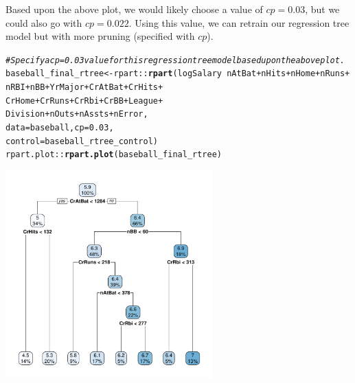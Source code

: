 \documentclass{article}\usepackage[]{graphicx}\usepackage[]{color}
\makeatletter
\newcommand{\hlnum}[1]{\textcolor[rgb]{0.686,0.059,0.569}{#1}}%
\newcommand{\hlcom}[1]{\textcolor[rgb]{0.678,0.584,0.686}{\textit{#1}}}%
\newcommand{\hlopt}[1]{\textcolor[rgb]{0,0,0}{#1}}%
\newcommand{\hlstd}[1]{\textcolor[rgb]{0.345,0.345,0.345}{#1}}%
\newcommand{\hlkwb}[1]{\textcolor[rgb]{0.69,0.353,0.396}{#1}}%
\newcommand{\hlkwc}[1]{\textcolor[rgb]{0.333,0.667,0.333}{#1}}%
\newcommand{\hlkwd}[1]{\textcolor[rgb]{0.737,0.353,0.396}{\textbf{#1}}}%
\newenvironment{kframe}{%
 \def\at@end@of@kframe{}%
 \ifinner\ifhmode%
  \def\at@end@of@kframe{\end{minipage}}%
  \begin{minipage}{\columnwidth}%
 \fi\fi%
 \def\FrameCommand##1{\hskip\@totalleftmargin \hskip-\fboxsep
 \colorbox{shadecolor}{##1}\hskip-\fboxsep
     \hskip-\linewidth \hskip-\@totalleftmargin \hskip\columnwidth}%
 \MakeFramed {\advance\hsize-\width
   \@totalleftmargin\z@ \linewidth\hsize
   \@setminipage}}%
 {\par\unskip\endMakeFramed%
 \at@end@of@kframe}
\newenvironment{knitrout}{}{} %
\makeatother
\begin{document}
Based upon the above plot, we would likely choose a value of $cp = 0.03$, but we could also go with $cp = 0.022$. Using this value, we can retrain our regression tree model but with more pruning (specified with $cp$).

\begin{knitrout}
\color{fgcolor}\begin{kframe}
\begin{alltt}
\hlcom{# Specify a cp=0.03 value for this regression tree model based upon the above plot.}
\hlstd{baseball_final_rtree} \hlkwb{<-}\hlstd{rpart}\hlopt{::}\hlkwd{rpart}\hlstd{(logSalary} \hlopt{~} \hlstd{nAtBat} \hlopt{+} \hlstd{nHits} \hlopt{+} \hlstd{nHome} \hlopt{+} \hlstd{nRuns} \hlopt{+}
                                      \hlstd{nRBI} \hlopt{+} \hlstd{nBB} \hlopt{+} \hlstd{YrMajor} \hlopt{+} \hlstd{CrAtBat} \hlopt{+} \hlstd{CrHits} \hlopt{+}
                                      \hlstd{CrHome} \hlopt{+} \hlstd{CrRuns} \hlopt{+} \hlstd{CrRbi} \hlopt{+} \hlstd{CrBB} \hlopt{+} \hlstd{League} \hlopt{+}
                                      \hlstd{Division} \hlopt{+} \hlstd{nOuts} \hlopt{+} \hlstd{nAssts} \hlopt{+} \hlstd{nError,}
                               \hlkwc{data} \hlstd{= baseball,} \hlkwc{cp} \hlstd{=} \hlnum{0.03}\hlstd{,}
                               \hlkwc{control} \hlstd{= baseball_rtree_control)}
\hlstd{rpart.plot}\hlopt{::}\hlkwd{rpart.plot}\hlstd{(baseball_final_rtree)}
\end{alltt}
\end{kframe}

{\centering \includegraphics[width=0.6\textwidth]{figure/unnamed-chunk-5-1} 

}



\end{knitrout}
\end{document}
